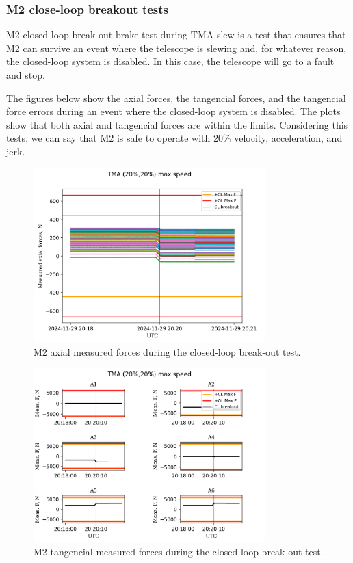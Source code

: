 \subsubsection{M2 close-loop breakout tests}
\label{subsubsec:m2_close_loop_breakout_tests}

 M2 closed-loop break-out brake test during TMA slew is a test that
ensures that M2 can survive an event where the telescope is slewing and, for whatever reason,
the closed-loop system is disabled. In this case, the telescope will go to a fault and stop.

The figures below show the axial forces, the tangencial forces, and the tangencial force errors
during an event where the closed-loop system is disabled. The plots show that both axial and
tangencial forces are within the limits. Considering this tests, we can say that M2 is safe to
operate with 20\% velocity, acceleration, and jerk.

\begin{figure}
    \centering
    \includegraphics[width=0.8\textwidth]{spa/20_vel_acc_jerk/BLOCK-T241_m2_axial_measured_forces.png}
    \caption{M2 axial measured forces during the closed-loop break-out test.}
    \label{fig:block241_m2_axial_measured_forces}
    \end{figure}

\begin{figure}
    \centering
    \includegraphics[width=0.8\textwidth]{spa/20_vel_acc_jerk/BLOCK-T241_m2_tangent_measured_forces.png}
    \caption{M2 tangencial measured forces during the closed-loop break-out test.}
    \label{fig:block241_m2_tangent_measured_forces}
    \end{figure}

